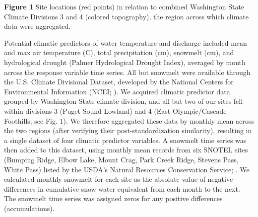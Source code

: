 \documentclass[notitlepage]{article}
\begin{document}
\begin{center}
\textbf{Figure 1} Site locations (red points) in relation to combined Washington State Climate Divisions 3 and 4 (colored topography), the region across which climate data were aggregated.
\end{center}

Potential climatic predictors of water temperature and discharge included mean and max air temperature (\degree C), total precipitation (cm), snowmelt (cm), and hydrological drought (Palmer Hydrological Drought Index), averaged by month across the response variable time series. All but snowmelt were available through the U.S. Climate Divisional Dataset, developed by the National Centers for Environmental Information (NCEI; \citealt{climateData}). We acquired climatic predictor data grouped by Washington State climate division, and all but two of our sites fell within divisions 3 (Puget Sound Lowland) and 4 (East Olympic/Cascade Foothills; see Fig. 1). We therefore aggregated these data by monthly mean across the two regions (after verifying their post-standardization similarity), resulting in a single dataset of four climatic predictor variables. A snowmelt time series was then added to this dataset, using monthly mean records from six SNOTEL sites (Bumping Ridge, Elbow Lake, Mount Crag, Park Creek Ridge, Stevens Pass, White Pass) listed by the USDA's Natural Resources Conservation Service; \citealt{snowData}. We calculated monthly snowmelt for each site as the absolute value of negative differences in cumulative snow water equivalent from each month to the next. The snowmelt time series was assigned zeros for any positive differences (accumulations).
\end{document}
